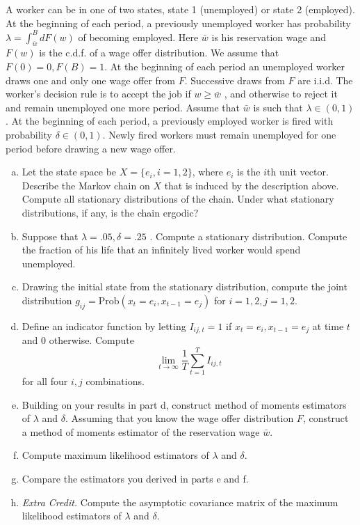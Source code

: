 \documentclass{homework}
\begin{document}
\begin{homeworkProblem}

  A worker can be in one of two states, state 1 (unemployed) or state 2 (employed). At the beginning of each period, a previously unemployed worker has probability $\lambda = \int_{\bar{w}}^B dF(w)$ of becoming employed. Here $\bar{w}$ is his reservation wage and $F (w)$ is the c.d.f. of a wage offer distribution. We assume that $F(0) = 0,F(B) = 1$. At the beginning of each period an unemployed worker draws one and only one wage offer from $F$. Successive draws from $F$ are i.i.d. The worker's decision rule is to accept the job if $w \ge \bar{w}$ , and otherwise to reject it and remain unemployed one more period. Assume that $\bar{w}$ is such that $\lambda \in (0,1)$. At the beginning of each period, a previously employed worker is fired with probability $\delta \in (0,1)$. Newly fired workers must remain unemployed for one period before drawing a new wage offer.

  \begin{enumerate}[a.]
    \item Let the state space be $X = \{e_i, i=1, 2\}$, where $e_i$ is the $i$th unit vector. Describe the Markov chain on $X$ that is induced by the description above. Compute all stationary distributions of the chain. Under what stationary distributions, if any, is the chain ergodic?
    \item Suppose that $\lambda = .05, \delta = .25$ . Compute a stationary distribution. Compute the fraction of his life that an infinitely lived worker would spend unemployed.
    \item Drawing the initial state from the stationary distribution, compute the joint distribution $g_{ij} = \text{Prob}(x_t=e_i, x_{t-1}=e_j)$ for $i=1, 2, j=1, 2$.
    \item Define an indicator function by letting $I_{ij, t} = 1$ if $x_t = e_i, x_{t-1} = e_j$ at time $t$ and $0$ otherwise. Compute $$\lim_{t \rightarrow \infty} \frac{1}{T} \sum_{t=1}^T I_{ij, t}$$ for all four $i, j$ combinations.
    \item Building on your results in part d, construct method of moments estimators of $\lambda$ and $\delta$. Assuming that you know the wage offer distribution $F$, construct a method of moments estimator of the reservation wage $\bar{w}$.
    \item Compute maximum likelihood estimators of $\lambda$ and $\delta$.
    \item Compare the estimators you derived in parts e and f.
    \item \textit{Extra Credit.} Compute the asymptotic covariance matrix of the maximum likelihood estimators of $\lambda$ and $\delta$.
  \end{enumerate}


\end{homeworkProblem}
\end{document}
